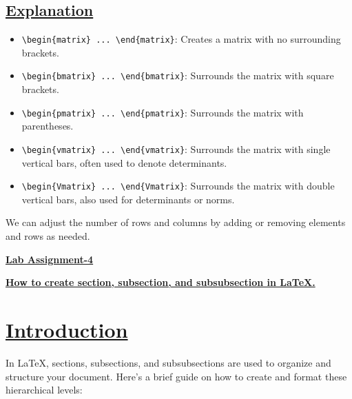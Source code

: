 \documentclass{article}
\begin{document}
\begin{center}
\section*{\textbf{\underline{\LARGE{Explanation}}}}
\end{center}
\begin{itemize}
  \item \texttt{\textbackslash begin\{matrix\} ... \textbackslash end\{matrix\}}: Creates a matrix with no surrounding brackets.
  \item \texttt{\textbackslash begin\{bmatrix\} ... \textbackslash end\{bmatrix\}}: Surrounds the matrix with square brackets.
  \item \texttt{\textbackslash begin\{pmatrix\} ... \textbackslash end\{pmatrix\}}: Surrounds the matrix with parentheses.
  \item \texttt{\textbackslash begin\{vmatrix\} ... \textbackslash end\{vmatrix\}}: Surrounds the matrix with single vertical bars, often used to denote determinants.
  \item \texttt{\textbackslash begin\{Vmatrix\} ... \textbackslash end\{Vmatrix\}}: Surrounds the matrix with double vertical bars, also used for determinants or norms.
\end{itemize}

We can adjust the number of rows and columns by adding or removing elements and rows as needed.

\newpage
{}

\begin{center}
    \textbf{\underline{\large{Lab Assignment-4}}}
\end{center}
\begin{center}
    \textbf{\underline{\large{How to create section, subsection, and subsubsection in LaTeX.}}}
\end{center}
\section*{\underline{Introduction}}

In LaTeX, sections, subsections, and subsubsections are used to organize and structure your document. Here’s a brief guide on how to create and format these hierarchical levels:
\end{document}
